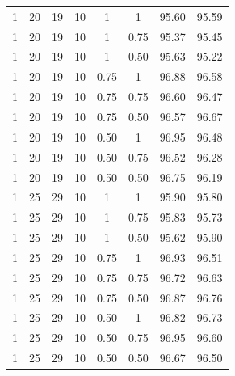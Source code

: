 \begin{table}[H]
\begin{tabular}{ccccccrr}
	1      		& 20     			& 19     		& 10     			& 1      				& 1      				& 95.60    				& 95.59\\ 
	1      		& 20     			& 19     		& 10     			& 1      				& 0.75					& 95.37				    & 95.45\\ 
	1      		& 20     			& 19     		& 10     			& 1      				& 0.50					& 95.63    				& 95.22\\
	1      		& 20     			& 19     		& 10     			& 0.75    				& 1     				& 96.88    				& 96.58\\  
	1		    & 20     			& 19     		& 10     			& 0.75    				& 0.75				    & 96.60    				& 96.47\\ 
	1      		& 20     			& 19     		& 10     			& 0.75    				& 0.50    				& 96.57					& 96.67\\
	1      		& 20     			& 19     		& 10     			& 0.50    				& 1						& 96.95   				& 96.48\\ 
	1      		& 20     			& 19     		& 10     			& 0.50    				& 0.75    				& 96.52    				& 96.28\\ 
	1      		& 20     			& 19     		& 10     			& 0.50    				& 0.50    				& 96.75    				& 96.19\\ 

	1      		& 25     			& 29     		& 10     			& 1      				& 1      				& 95.90    				& 95.80\\
	1	      	& 25     			& 29     		& 10     			& 1      				& 0.75    				& 95.83    				& 95.73\\
	1      		& 25     			& 29     		& 10     			& 1      				& 0.50    				& 95.62					& 95.90\\
	1      		& 25     			& 29     		& 10     			& 0.75    				& 1      				& 96.93    				& 96.51\\
 	1      		& 25     			& 29     		& 10     			& 0.75    				& 0.75    				& 96.72    				& 96.63\\ 
	1      		& 25     			& 29     		& 10     			& 0.75    				& 0.50    				& 96.87					& 96.76\\
	1      		& 25     			& 29     		& 10     			& 0.50    				& 1      				& 96.82    				& 96.73\\ 
	1      		& 25     			& 29     		& 10     			& 0.50    				& 0.75    				& 96.95				    & 96.60\\
	1      		& 25     			& 29     		& 10     			& 0.50   				& 0.50    				& 96.67				    & 96.50\\


\end{tabular}
\end{table}
